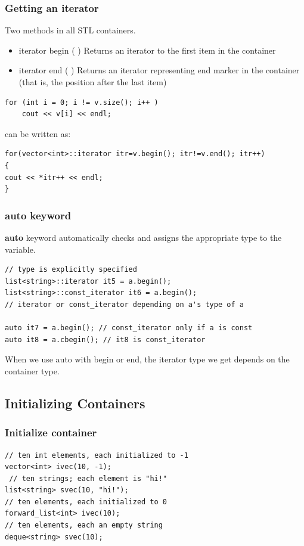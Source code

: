 \documentclass{beamer}
\newtheorem{Key points}{Key points}
\newcommand\Fontviaa{\fontsize{8}{7.2}\selectfont}
\begin{document}
 \begin{frame}
\frametitle{Getting an iterator}
{\color{red}Two methods in all STL containers.}
\begin{itemize}
\item iterator begin ( )
Returns an iterator to the first item in the container
\item iterator end ( )
Returns an iterator representing end marker in the container (that is, the position after the last item)
\end{itemize}
\begin{lstlisting}
for (int i = 0; i != v.size(); i++ )
	cout << v[i] << endl;
\end{lstlisting}
can be written as:
\Fontviaa
\begin{lstlisting}
for(vector<int>::iterator itr=v.begin(); itr!=v.end(); itr++)
{
cout << *itr++ << endl;
}
\end{lstlisting}
\end{frame}
 \begin{frame}
\frametitle{auto keyword}
\textbf{{\color{blue}auto}} keyword automatically checks and assigns the appropriate type to the variable.
\begin{lstlisting}
// type is explicitly specified
list<string>::iterator it5 = a.begin();
list<string>::const_iterator it6 = a.begin();
// iterator or const_iterator depending on a's type of a

auto it7 = a.begin(); // const_iterator only if a is const
auto it8 = a.cbegin(); // it8 is const_iterator
\end{lstlisting} 
When we use auto with begin or end, the iterator type we get depends on the
container type.
\end{frame}
\subsection{Initializing Containers}
\begin{frame}[fragile]
  \frametitle{Initialize container}
\begin{lstlisting}
// ten int elements, each initialized to -1
vector<int> ivec(10, -1); 
 // ten strings; each element is "hi!"
list<string> svec(10, "hi!");
// ten elements, each initialized to 0
forward_list<int> ivec(10); 
// ten elements, each an empty string
deque<string> svec(10); 

\end{lstlisting}
\end{frame}
\end{document}
